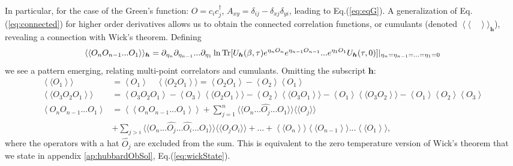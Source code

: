 In particular, for the case of the Green's function: $O = c_i c_j^\dagger$, $A_{xy} = \delta_{i j} - \delta_{xj} \delta_{yi}$, leading to Eq.(\ref{eq:eqG}).
A generalization of Eq.(\ref{eq:connected}) for higher order derivatives allows us to obtain the connected correlation functions, or cumulants (denoted $\left\langle\langle \quad \right\rangle\rangle_{\bm h}$), revealing a connection with Wick's theorem.
Defining
\begin{equation}
\left\langle\langle O_n O_{n-1}... O_1  \right\rangle\rangle_{\bm h} = \partial_{\eta_n} \partial_{\eta_{n-1}} ... \partial_{\eta_1} \ln \operatorname{Tr} [ U_{\bm h} (\beta, \tau ) e^{\eta_n O_n} e^{\eta_{n-1} O_{n-1}} ... e^{\eta_1 O_1} U_{\bm h} (\tau, 0) ] |_{\eta_n = \eta_{n-1} =...= \eta_1 = 0}
\end{equation}
we see a pattern emerging, relating multi-point correlators and cumulants.
Omitting the subscript $\bm h$:
\begin{equation}\label{eq:allOrderCumulants}
\begin{split}
\left\langle\langle O_1  \right\rangle\rangle &= \left\langle O_1  \right\rangle \quad
\left\langle\langle O_2 O_1  \right\rangle\rangle = \left\langle O_2 O_1  \right\rangle - \left\langle O_2  \right\rangle \left\langle O_1  \right\rangle \\
\left\langle\langle O_3 O_2 O_1  \right\rangle\rangle &= \left\langle O_3 O_2 O_1  \right\rangle - \left\langle O_3  \right\rangle \left\langle\langle O_2 O_1  \right\rangle\rangle - \left\langle O_2  \right\rangle \left\langle\langle O_3 O_1  \right\rangle\rangle - \left\langle O_1  \right\rangle \left\langle\langle O_3 O_2  \right\rangle\rangle - \left\langle O_1  \right\rangle \left\langle O_2  \right\rangle \left\langle O_3  \right\rangle \\
\left\langle O_n O_{n-1} ... O_1  \right\rangle &= \left\langle \left\langle O_n O_{n-1} ... O_1  \right\rangle\right\rangle + \sum_{j=1}^n  \big\langle \big\langle O_n ... \widehat{O_j} ... O_1  \big\rangle\big\rangle  \big\langle \big\langle O_j \big\rangle\big\rangle \\
&+ \sum_{j >i} \big\langle \big\langle O_n ... \widehat{O_j} ... \widehat{O_i} ... O_1  \big\rangle\big\rangle  \big\langle \big\langle O_j O_i \big\rangle\big\rangle + ... + \left\langle\langle O_n  \right\rangle\rangle \left\langle\langle O_{n-1}  \right\rangle\rangle ... \left\langle\langle O_1  \right\rangle\rangle ,
\end{split}
\end{equation}
where the operators with a hat $\widehat{O_j}$ are excluded from the sum.
This is equivalent to the zero temperature version of Wick's theorem that we state in appendix \ref{ap:hubbardObSol}, Eq.(\ref{eq:wickState}).

